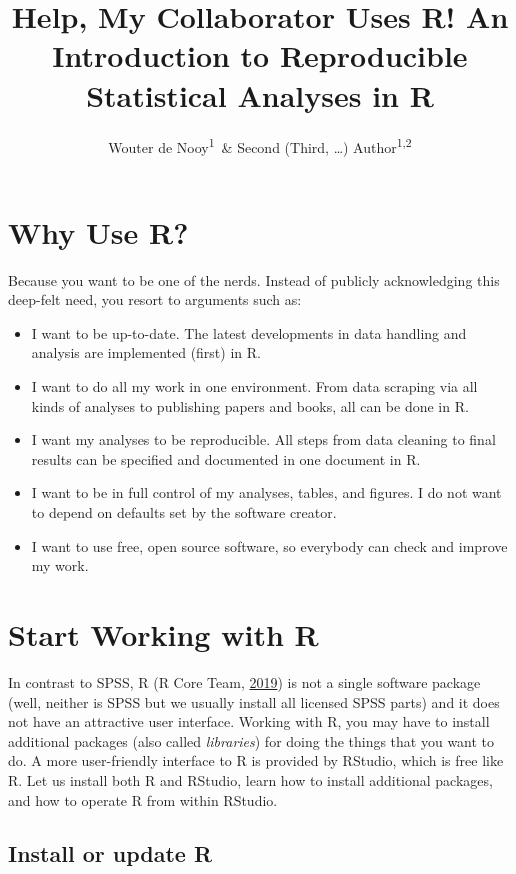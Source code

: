 \documentclass[doc,floatsintext]{apa6}
\title{Help, My Collaborator Uses R! An Introduction to Reproducible
Statistical Analyses in R}
\author{Wouter de Nooy\textsuperscript{1}~\& Second (Third, \ldots{})
Author\textsuperscript{1,2}}
\date{}
\affiliation{
\vspace{0.5cm}
\textsuperscript{1} Amsterdam School of Communication Research ASCoR\\\textsuperscript{2} University of Amsterdam}
\providecommand{\tightlist}{%
  \setlength{\itemsep}{0pt}\setlength{\parskip}{0pt}}
\begin{document}
\maketitle

\section{Why Use R?}\label{why-use-r}

Because you want to be one of the nerds. Instead of publicly
acknowledging this deep-felt need, you resort to arguments such as:

\begin{itemize}
\tightlist
\item
  I want to be up-to-date. The latest developments in data handling and
  analysis are implemented (first) in R.
\item
  I want to do all my work in one environment. From data scraping via
  all kinds of analyses to publishing papers and books, all can be done
  in R.
\item
  I want my analyses to be reproducible. All steps from data cleaning to
  final results can be specified and documented in one document in R.
\item
  I want to be in full control of my analyses, tables, and figures. I do
  not want to depend on defaults set by the software creator.
\item
  I want to use free, open source software, so everybody can check and
  improve my work.
\end{itemize}

\section{Start Working with R}\label{start-working-with-r}

In contrast to SPSS, R (R Core Team,
\protect\hyperlink{ref-R-base}{2019}) is not a single software package
(well, neither is SPSS but we usually install all licensed SPSS parts)
and it does not have an attractive user interface. Working with R, you
may have to install additional packages (also called \emph{libraries})
for doing the things that you want to do. A more user-friendly interface
to R is provided by RStudio, which is free like R. Let us install both R
and RStudio, learn how to install additional packages, and how to
operate R from within RStudio.

\subsection{Install or update R}\label{install-or-update-r}
\end{document}
